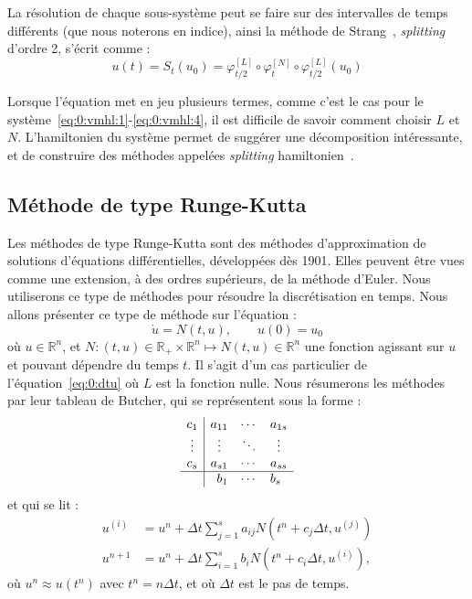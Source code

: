 La résolution de chaque sous-système peut se faire sur des intervalles de temps différents (que nous noterons en indice), ainsi la méthode de Strang~\cite{Strang:1968}, \emph{splitting} d'ordre 2, s'écrit comme :
$$
  u(t) = S_{t}(u_0) = \varphi^{[L]}_{t/2}\circ\varphi^{[N]}_{t}\circ\varphi^{[L]}_{t/2}(u_0)
$$

Lorsque l'équation met en jeu plusieurs termes, comme c'est le cas pour le système~\eqref{eq:0:vmhl:1}-\eqref{eq:0:vmhl:4}, il est difficile de savoir comment choisir $L$ et $N$. L'hamiltonien du système permet de suggérer une décomposition intéressante, et de construire des méthodes appelées \emph{splitting} hamiltonien~\cite{Crouseilles:2015,Casas:2017,Bernier:2020,Li:2019}.


\subsection{Méthode de type Runge-Kutta}

Les méthodes de type Runge-Kutta sont des méthodes d'approximation de solutions d'équations différentielles, développées dès 1901. Elles peuvent être vues comme une extension, à des ordres supérieurs, de la méthode d'Euler. Nous utiliserons ce type de méthodes pour résoudre la discrétisation en temps. Nous allons présenter ce type de méthode sur l'équation :
$$
  \dot{u} = N(t,u),\qquad u(0)=u_0
$$
où $u\in\mathbb{R}^n$, et $N:(t,u)\in\mathbb{R}_+\times\mathbb{R}^n\mapsto N(t,u)\in\mathbb{R}^n$ une fonction agissant sur $u$ et pouvant dépendre du temps $t$. Il s'agit d'un cas particulier de l'équation~\eqref{eq:0:dtu} où $L$ est la fonction nulle. Nous résumerons les méthodes par leur tableau de Butcher\cite{Butcher:2008}, qui se représentent sous la forme :
\begin{equation}  
  \begin{array}{c|c}
    \begin{matrix}
      c_1 \\
      \vdots \\
      c_s
    \end{matrix}
    &
    \begin{matrix}
      a_{11} & \cdots & a_{1s} \\
      \vdots & \ddots & \vdots \\
      a_{s1} & \cdots & a_{ss}
    \end{matrix} \\
    \hline
     & \begin{matrix} b_1 & \cdots & b_s \end{matrix} \\
  \end{array}
  \label{eq:0:butcher}
\end{equation}
et qui se lit :
$$
  \begin{aligned}
    u^{(i)} &= u^n + \Delta t \sum_{j=1}^s a_{ij} N(t^n+c_j\Delta t,u^{(j)}) \\
    u^{n+1} &= u^n + \Delta t \sum_{i=1}^s b_i N(t^n+c_i\Delta t, u^{(i)}),
  \end{aligned}
$$
où $u^n\approx u(t^n)$ avec $t^n=n\Delta t$, et où $\Delta t$ est le pas de temps.

